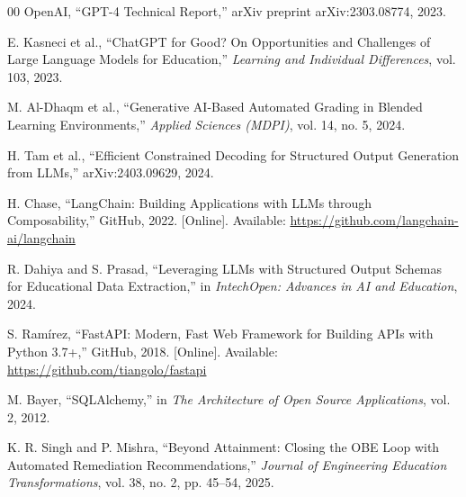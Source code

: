 \documentclass[conference]{IEEEtran}
\begin{document}
\begin{thebibliography}{00}
OpenAI, ``GPT-4 Technical Report,'' arXiv preprint arXiv:2303.08774, 2023.

E. Kasneci et al., ``ChatGPT for Good? On Opportunities and Challenges of Large Language Models for Education,'' \textit{Learning and Individual Differences}, vol. 103, 2023.

M. Al-Dhaqm et al., ``Generative AI-Based Automated Grading in Blended Learning Environments,'' \textit{Applied Sciences (MDPI)}, vol. 14, no. 5, 2024.

H. Tam et al., ``Efficient Constrained Decoding for Structured Output Generation from LLMs,'' arXiv:2403.09629, 2024.

H. Chase, ``LangChain: Building Applications with LLMs through Composability,'' GitHub, 2022. [Online]. Available: \url{https://github.com/langchain-ai/langchain}

R. Dahiya and S. Prasad, ``Leveraging LLMs with Structured Output Schemas for Educational Data Extraction,'' in \textit{IntechOpen: Advances in AI and Education}, 2024.

S. Ramírez, ``FastAPI: Modern, Fast Web Framework for Building APIs with Python 3.7+,'' GitHub, 2018. [Online]. Available: \url{https://github.com/tiangolo/fastapi}

M. Bayer, ``SQLAlchemy,'' in \textit{The Architecture of Open Source Applications}, vol. 2, 2012.

K. R. Singh and P. Mishra, ``Beyond Attainment: Closing the OBE Loop with Automated Remediation Recommendations,'' \textit{Journal of Engineering Education Transformations}, vol. 38, no. 2, pp. 45--54, 2025.

\end{thebibliography}
\end{document}
